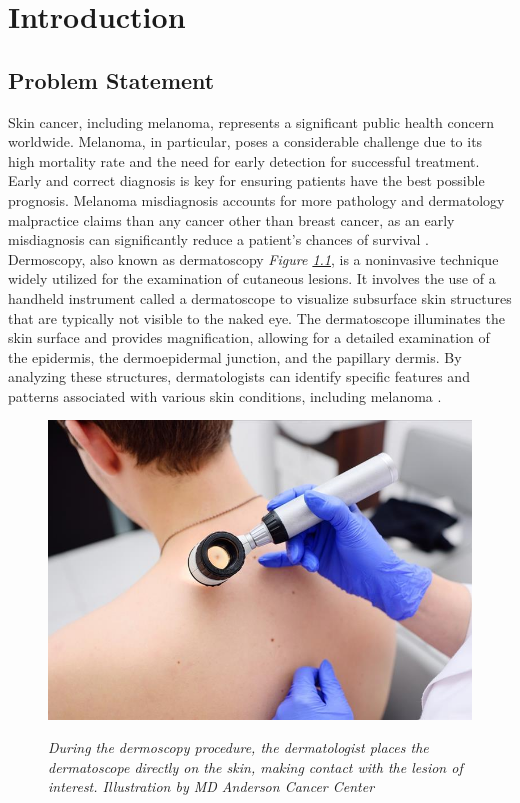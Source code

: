 \chapter{Introduction}
\label{cap:intro}

\section{Problem Statement}

Skin cancer, including melanoma, represents a significant public health concern worldwide. Melanoma, in particular, poses a considerable challenge due to its high mortality rate and the need for early detection for successful treatment. Early and correct diagnosis is key for ensuring patients have the best possible prognosis.
Melanoma misdiagnosis accounts for more pathology and dermatology malpractice claims than any
cancer other than breast cancer, as an early misdiagnosis can significantly reduce a patient’s chances of
survival \cite{Melanoma}. \\

Dermoscopy, also known as dermatoscopy \textit{Figure \ref{fig:procedure_dermoscopy}}, is a noninvasive technique widely utilized for the examination of cutaneous lesions. It involves the use of a handheld instrument called a dermatoscope to visualize subsurface skin structures that are typically not visible to the naked eye. The dermatoscope illuminates the skin surface and provides magnification, allowing for a detailed examination of the epidermis, the dermoepidermal junction, and the papillary dermis. By analyzing these structures, dermatologists can identify specific features and patterns associated with various skin conditions, including melanoma \cite{Dermoscopy}.

\begin{figure}[htb]
\centering
\includegraphics[width=6.5 cm]{imatges/introduction/medical_procedure_dermastocopy.jpeg}
\caption[Dermoscopy Procedure]{\textit{During the dermoscopy procedure, the dermatologist places the dermatoscope directly on the skin, making contact with the lesion of interest. Illustration by MD Anderson Cancer Center}}
{\label{fig:procedure_dermoscopy}}
\end{figure}

